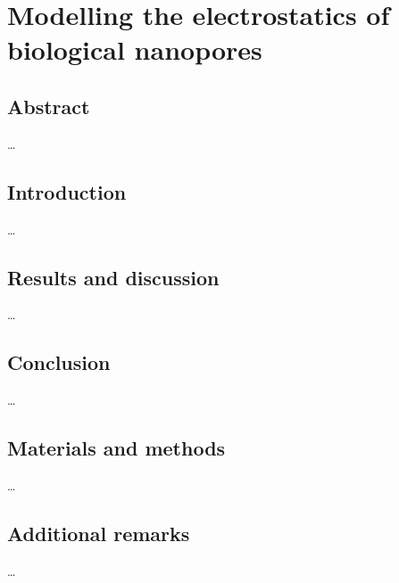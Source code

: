 \chapter{Modelling the electrostatics of biological nanopores}\label{ch:electrostatics}

\section{Abstract}
\ldots
\section{Introduction}
\ldots
\section{Results and discussion}
\ldots
\section{Conclusion}
\ldots
\section{Materials and methods}
\ldots
\section{Additional remarks}
\ldots




\cleardoublepage

